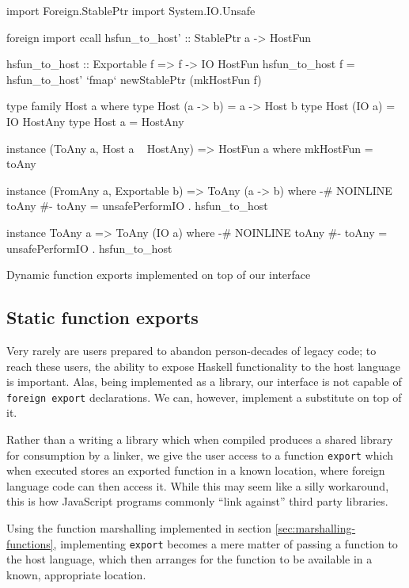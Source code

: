 \documentclass{sigplanconf}
\begin{document}
\begin{listingfloat}
\begin{code}
  import Foreign.StablePtr
  import System.IO.Unsafe

  foreign import ccall
    hsfun_to_host' :: StablePtr a -> HostFun

  hsfun_to_host :: Exportable f => f -> IO HostFun
  hsfun_to_host f =
    hsfun_to_host' `fmap` newStablePtr (mkHostFun f)

  type family Host a where
    type Host (a -> b) = a -> Host b
    type Host (IO a)   = IO HostAny
    type Host a        = HostAny

  instance (ToAny a, Host a ~ HostAny) => HostFun a where
    mkHostFun = toAny

  instance (FromAny a, Exportable b) => ToAny (a -> b) where
    {-# NOINLINE toAny #-}
    toAny = unsafePerformIO . hsfun_to_host

  instance ToAny a => ToAny (IO a) where
    {-# NOINLINE toAny #-}
    toAny = unsafePerformIO . hsfun_to_host
\end{code}
\caption{Dynamic function exports implemented on top of our interface}
\label{lst:export-final}
\end{listingfloat}

\subsection{Static function exports}
\label{sec:exports}
Very rarely are users prepared to abandon person-decades of legacy code;
to reach these users, the ability to expose Haskell functionality to the host
language is important. Alas, being implemented as a library, our interface is
not capable of \lstinline!foreign export! declarations. We can, however,
implement a substitute on top of it.

Rather than a writing a library which when compiled produces a shared library
for consumption by a linker, we give the user access to a function
\lstinline!export! which when executed stores an exported function in a
known location, where foreign language code can then access it.
While this may seem like a silly workaround, this is how JavaScript programs
commonly ``link against'' third party libraries.

Using the function marshalling implemented in section
\ref{sec:marshalling-functions}, implementing \lstinline!export! becomes a
mere matter of passing a function to the host language, which then
arranges for the function to be available in a known, appropriate location.
\end{document}
